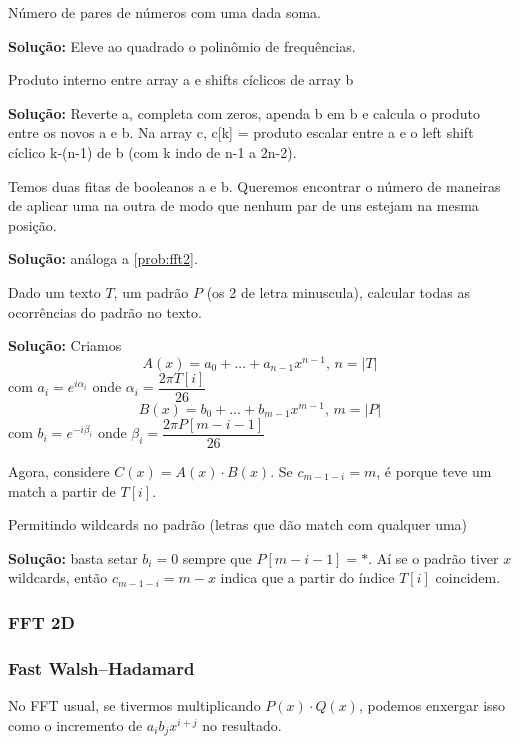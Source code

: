  Número de pares de números com uma dada soma.

\textbf{Solução:} Eleve ao quadrado o polinômio de frequências.

 Produto interno entre array a e shifts cíclicos de array b

\textbf{Solução:} Reverte a, completa com zeros, apenda b em b e calcula o produto entre os novos a e b. Na array c, c[k] = produto escalar entre a e o left shift cíclico k-(n-1) de b (com k indo de n-1 a 2n-2).


 Temos duas fitas de booleanos a e b. Queremos encontrar o número de maneiras de aplicar uma na outra de modo que nenhum par de uns estejam na mesma posição.

\textbf{Solução:} análoga a \ref{prob:fft2}.

 Dado um texto $T$, um padrão $P$ (os 2 de letra minuscula), calcular todas as ocorrências do padrão no texto.

\textbf{Solução:} Criamos
$$A(x) = a_0 + \dots + a_{n-1} x^{n-1}, \, n= |T|$$
com $a_i = e^{i \alpha_i}$ onde $\alpha_i = \dfrac{2 \pi T[i]}{26}$
$$B(x) = b_0 + \dots + b_{m-1} x^{m-1}, \, m = |P|$$
com $b_i = e^{-i \beta_i}$ onde $\beta_i = \dfrac{2 \pi P[m-i-1]}{26}$

Agora, considere $C(x) = A(x) \cdot B(x)$. Se $c_{m-1-i} = m$, é porque teve um match a partir de $T[i]$.

 Permitindo wildcards no padrão (letras que dão match com qualquer uma)

\textbf{Solução:} basta  setar $b_i=0$ sempre que $P[m-i-1] = *$. Aí se o padrão tiver $x$ wildcards, então $c_{m-1-i} = m-x$ indica que a partir do índice $T[i]$ coincidem.

\subsubsection{FFT 2D}


\subsubsection{Fast Walsh–Hadamard}

No FFT usual, se tivermos multiplicando $P(x) \cdot Q(x)$, podemos enxergar isso
como o incremento de $a_i b_j x^{i+j}$ no resultado. 


